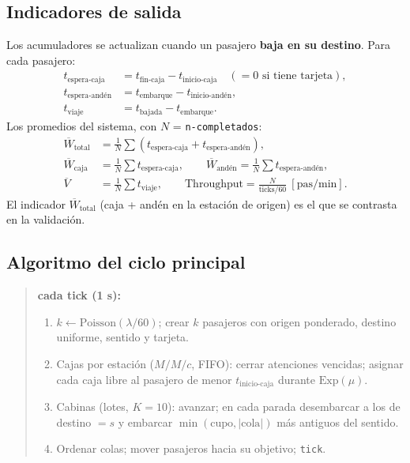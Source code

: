 \documentclass[11pt,a4paper]{article}
\newcommand{\code}[1]{\texttt{#1}}
\begin{document}
\subsection{Indicadores de salida}
Los acumuladores se actualizan cuando un pasajero \textbf{baja en su destino}. Para
cada pasajero:
\begin{align}
t_{\text{espera-caja}}  &= t_{\text{fin-caja}} - t_{\text{inicio-caja}} \quad(=0 \text{ si tiene tarjeta}),\\
t_{\text{espera-andén}} &= t_{\text{embarque}} - t_{\text{inicio-andén}},\\
t_{\text{viaje}}        &= t_{\text{bajada}} - t_{\text{embarque}}.
\end{align}
Los promedios del sistema, con $N$ = \code{n-completados}:
\begin{align}
\overline{W}_{\text{total}} &= \frac{1}{N}\sum (t_{\text{espera-caja}} + t_{\text{espera-andén}}), \\
\overline{W}_{\text{caja}}  &= \frac{1}{N}\sum t_{\text{espera-caja}}, \qquad
\overline{W}_{\text{andén}} = \frac{1}{N}\sum t_{\text{espera-andén}}, \\
\overline{V} &= \frac{1}{N}\sum t_{\text{viaje}}, \qquad
\text{Throughput} = \frac{N}{\text{ticks}/60}\ [\text{pas/min}].
\end{align}
El indicador $\overline{W}_{\text{total}}$ (caja + andén en la estación de origen) es
el que se contrasta en la validación.

\subsection{Algoritmo del ciclo principal}
\begin{quote}\small
\textbf{cada tick (1 s):}
\begin{enumerate}[nosep,leftmargin=2em]
  \item $k \leftarrow \mathrm{Poisson}(\lambda/60)$; crear $k$ pasajeros con origen
  ponderado, destino uniforme, sentido y tarjeta.
  \item Cajas por estación ($M/M/c$, FIFO): cerrar atenciones vencidas; asignar cada
  caja libre al pasajero de menor $t_{\text{inicio-caja}}$ durante
  $\mathrm{Exp}(\mu)$.
  \item Cabinas (lotes, $K=10$): avanzar; en cada parada desembarcar a los de
  destino $=s$ y embarcar $\min(\text{cupo},|\text{cola}|)$ más antiguos del sentido.
  \item Ordenar colas; mover pasajeros hacia su objetivo; \code{tick}.
\end{enumerate}
\end{quote}
\end{document}
